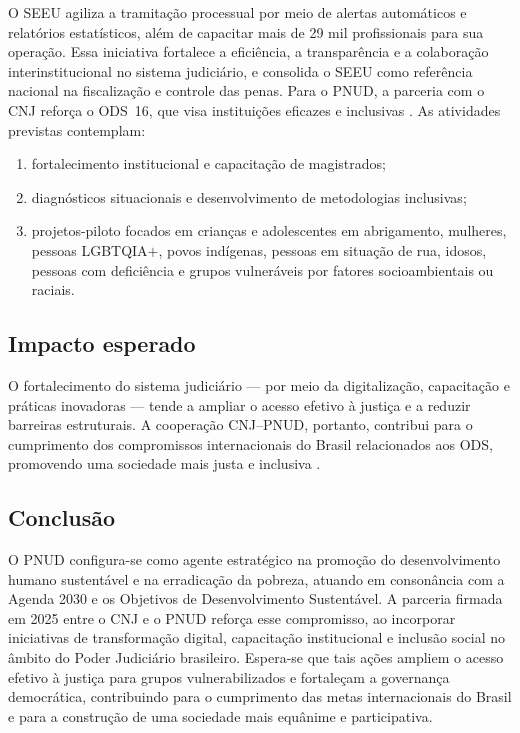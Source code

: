 \begin{description}
O SEEU agiliza a tramitação processual por meio de alertas automáticos e relatórios estatísticos, além de capacitar mais de 29 mil profissionais para sua operação. Essa iniciativa fortalece a eficiência, a transparência e a colaboração interinstitucional no sistema judiciário, e consolida o SEEU como referência nacional na fiscalização e controle das penas. Para o PNUD, a parceria com o CNJ reforça o ODS~16, que visa instituições eficazes e inclusivas
\cite{undp2025pnudcnj}. As atividades previstas contemplam:
\begin{enumerate}
  \item fortalecimento institucional e capacitação de magistrados;
  \item diagnósticos situacionais e desenvolvimento de metodologias inclusivas;
  \item projetos-piloto focados em crianças e adolescentes em abrigamento,
        mulheres, pessoas LGBTQIA$+$, povos indígenas, pessoas em situação de
        rua, idosos, pessoas com deficiência e grupos vulneráveis por fatores
        socioambientais ou raciais.
\end{enumerate}

\subsection*{Impacto esperado}
O fortalecimento do sistema judiciário — por meio da digitalização,
capacitação e práticas inovadoras — tende a ampliar o acesso efetivo à justiça e
a reduzir barreiras estruturais. A cooperação CNJ–PNUD, portanto, contribui para
o cumprimento dos compromissos internacionais do Brasil relacionados aos ODS,
promovendo uma sociedade mais justa e inclusiva
\cite{undp2025pnudcnj}.

\subsection{Conclusão}
O PNUD configura-se como agente estratégico na promoção do desenvolvimento humano sustentável e na erradicação da pobreza, atuando em consonância com a Agenda 2030 e os Objetivos de Desenvolvimento Sustentável. A parceria firmada em 2025 entre o CNJ e o PNUD reforça esse compromisso, ao incorporar iniciativas de transformação digital, capacitação institucional e inclusão social no âmbito do Poder Judiciário brasileiro. Espera-se que tais ações ampliem o acesso efetivo à justiça para grupos vulnerabilizados e fortaleçam a governança democrática, contribuindo para o cumprimento das metas internacionais do Brasil e para a construção de uma sociedade mais equânime e participativa.




\end{description}
